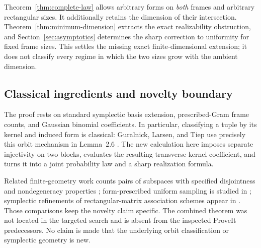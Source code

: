 Theorem~\ref{thm:complete-law} allows arbitrary forms on \emph{both} frames and arbitrary rectangular sizes. It additionally retains the dimension of their intersection. Theorem~\ref{thm:minimum-dimension} extracts the exact realizability obstruction, and Section~\ref{sec:asymptotics} determines the sharp correction to uniformity for fixed frame sizes. This settles the missing exact finite-dimensional extension; it does not classify every regime in which the two sizes grow with the ambient dimension.

\subsection{Classical ingredients and novelty boundary}

The proof rests on standard symplectic basis extension, prescribed-Gram frame counts, and Gaussian binomial coefficients. In particular, classifying a tuple by its kernel and induced form is classical: Guralnick, Larsen, and Tiep use precisely this orbit mechanism in Lemma~2.6 \cite{glt}. The new calculation here imposes separate injectivity on two blocks, evaluates the resulting transverse-kernel coefficient, and turns it into a joint probability law and a sharp realization formula.

Related finite-geometry work counts pairs of subspaces with specified disjointness and nondegeneracy properties \cite{deboeck}; form-prescribed uniform sampling is studied in \cite{ishizuka}; symplectic refinements of rectangular-matrix association schemes appear in \cite{zhang}. Those comparisons keep the novelty claim specific. The combined theorem was not located in the targeted search and is absent from the inspected ProveIt predecessors. No claim is made that the underlying orbit classification or symplectic geometry is new.
